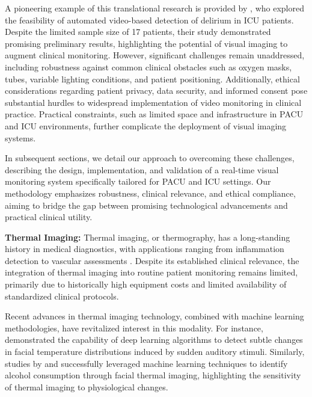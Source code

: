 A pioneering example of this translational research is provided by \citet{davoudi2019intelligent}, who explored the feasibility of automated video-based detection of delirium in ICU patients. Despite the limited sample size of 17 patients, their study demonstrated promising preliminary results, highlighting the potential of visual imaging to augment clinical monitoring. However, significant challenges remain unaddressed, including robustness against common clinical obstacles such as oxygen masks, tubes, variable lighting conditions, and patient positioning. Additionally, ethical considerations regarding patient privacy, data security, and informed consent pose substantial hurdles to widespread implementation of video monitoring in clinical practice. Practical constraints, such as limited space and infrastructure in PACU and ICU environments, further complicate the deployment of visual imaging systems.

In subsequent sections, we detail our approach to overcoming these challenges, describing the design, implementation, and validation of a real-time visual monitoring system specifically tailored for PACU and ICU settings. Our methodology emphasizes robustness, clinical relevance, and ethical compliance, aiming to bridge the gap between promising technological advancements and practical clinical utility.

\vspace{1ex}
\noindent
\textbf{Thermal Imaging:}
Thermal imaging, or thermography, has a long-standing history in medical diagnostics, with applications ranging from inflammation detection to vascular assessments \citep{ammer2019thermal}. Despite its established clinical relevance, the integration of thermal imaging into routine patient monitoring remains limited, primarily due to historically high equipment costs and limited availability of standardized clinical protocols.


Recent advances in thermal imaging technology, combined with machine learning methodologies, have revitalized interest in this modality. For instance, \citet{temperature_auditory_stimulus} demonstrated the capability of deep learning algorithms to detect subtle changes in facial temperature distributions induced by sudden auditory stimuli. Similarly, studies by \citet{koukiou2012drunk} and \citet{hermosilla2018face} successfully leveraged machine learning techniques to identify alcohol consumption through facial thermal imaging, highlighting the sensitivity of thermal imaging to physiological changes.

